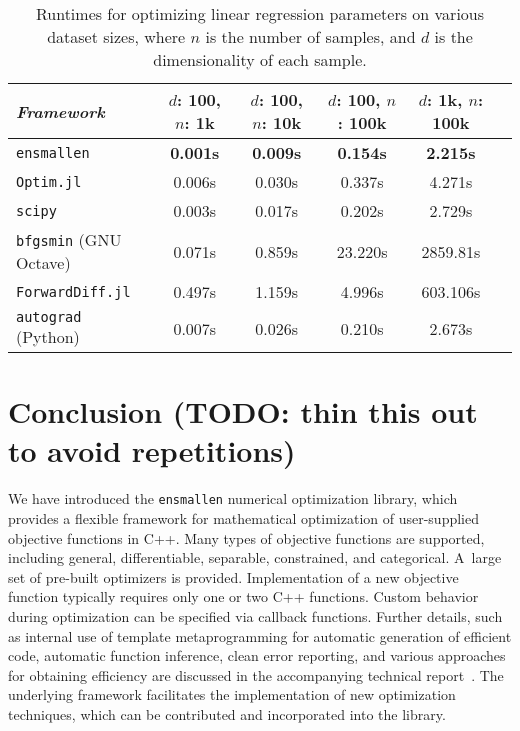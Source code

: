 \documentclass[twoside,11pt]{article}
\begin{document}
\begin{table}[t!]
{\small
\centering
\begin{tabular}{lccccc}
\toprule
{\em Framework} & $d$: 100, $n$: 1k & $d$: 100, $n$: 10k & $d$: 100, $n$:
100k & $d$: 1k, $n$: 100k \\
\midrule
\texttt{ensmallen} & {\bf 0.001s} & {\bf 0.009s} & {\bf 0.154s} & {\bf 2.215s} \\
\texttt{Optim.jl} & 0.006s & 0.030s & 0.337s & 4.271s \\
\texttt{scipy} & 0.003s & 0.017s & 0.202s & 2.729s \\
\texttt{bfgsmin} (GNU Octave) & 0.071s & 0.859s & 23.220s & 2859.81s\\
\texttt{ForwardDiff.jl} & 0.497s & 1.159s & 4.996s & 603.106s \\
\texttt{autograd} (Python) & 0.007s & 0.026s & 0.210s & 2.673s \\
\bottomrule
\end{tabular}
\vspace*{-0.4em}
\caption{
Runtimes for optimizing linear regression parameters on various dataset sizes,
where $n$ is the number of samples,
and $d$ is the dimensionality of each sample.
}
\label{tab:lbfgs}
}
\vspace*{-2.2em}
\end{table}


\section{Conclusion (TODO: thin this out to avoid repetitions)}
\label{sec:conclusion}

We have introduced the {\tt ensmallen} numerical optimization library,
which provides a flexible framework for mathematical optimization of user-supplied objective functions in C++.
Many types of objective functions are supported,
including general, differentiable, separable, constrained, and categorical.
A~large set of pre-built optimizers is provided.
Implementation of a new objective function typically requires only one or two C++ functions.
Custom behavior during optimization can be specified via callback functions.
Further details, such as
internal use of template metaprogramming for automatic generation of efficient code, 
automatic function inference,
clean error reporting, and various approaches for obtaining efficiency
are discussed in the accompanying technical report~\citep{ensmallen2020}.
The underlying framework facilitates the implementation of new optimization techniques,
which can be contributed and incorporated into the library.
\end{document}
